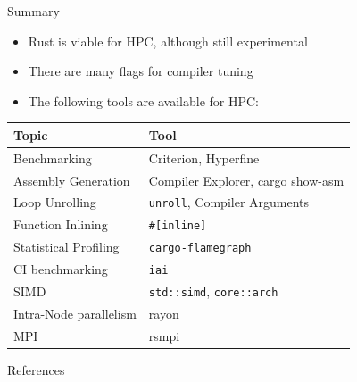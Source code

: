 \documentclass[compress,aspectratio=169]{beamer}
\begin{document}
\begin{frame}{Summary}
\label{pg:lastpage} %
  \begin{itemize}
    \item Rust is viable for HPC, although still experimental
      \pause
    \item There are many flags for compiler tuning
      \pause
    \item The following tools are available for HPC:
      \pause
  \end{itemize}
  \begin{table}[h]
\centering
    \begin{tabular}{|l|l|}
      \hline
      \textbf{Topic} & \textbf{Tool}\\
      \hline
      Benchmarking & Criterion, Hyperfine\\
      \hline
      Assembly Generation & Compiler Explorer, cargo show-asm\\
      \hline
      Loop Unrolling & \texttt{unroll}, Compiler Arguments\\
      \hline
      Function Inlining & \texttt{\#[inline]} \\
      \hline
      Statistical Profiling & \texttt{cargo-flamegraph} \\
      \hline
      CI benchmarking & \texttt{iai} \\
      \hline
      SIMD & \texttt{std::simd}, \texttt{core::arch} \\
      \hline
      Intra-Node parallelism & rayon \\
      \hline
      MPI & rsmpi \\
      \hline
    \end{tabular}
  \end{table}
\end{frame}

\begin{frame}[allowframebreaks]{References}
\renewcommand*{\bibfont}{\normalfont\scriptsize}
\printbibliography
\end{frame}
\end{document}
